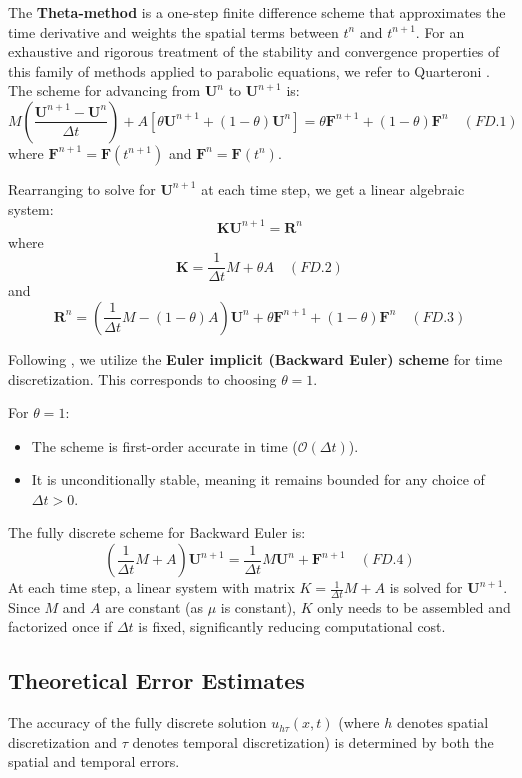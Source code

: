 \documentclass[
  11pt,
]{article}
\begin{document}
The \textbf{Theta-method} is a one-step finite difference scheme that
approximates the time derivative and weights the spatial terms between
$t^n$ and $t^{n+1}$. For an exhaustive and rigorous treatment of the stability and convergence properties of this family of methods applied to parabolic equations, we refer to Quarteroni \cite{quarteroni_numerical_models}. The scheme for advancing from $\mathbf{U}^n$ to
$\mathbf{U}^{n+1}$ is: \[
M \left( \frac{\mathbf{U}^{n+1} - \mathbf{U}^n}{\Delta t} \right) + A \left[ \theta \mathbf{U}^{n+1} + (1-\theta) \mathbf{U}^n \right] = \theta \mathbf{F}^{n+1} + (1-\theta) \mathbf{F}^n \quad (FD.1)
\] where $\mathbf{F}^{n+1} = \mathbf{F}(t^{n+1})$ and
$\mathbf{F}^n = \mathbf{F}(t^n)$.

Rearranging to solve for $\mathbf{U}^{n+1}$ at each time step, we get
a linear algebraic system: \[
\mathbf{K} \mathbf{U}^{n+1} = \mathbf{R}^n
\] where \[
\mathbf{K} = \frac{1}{\Delta t} M + \theta A \quad (FD.2)
\] and \[
\mathbf{R}^n = \left( \frac{1}{\Delta t} M - (1-\theta)A \right) \mathbf{U}^n + \theta \mathbf{F}^{n+1} + (1-\theta)\mathbf{F}^n \quad (FD.3)
\]

Following \cite{picasso1998}, we utilize the \textbf{Euler implicit (Backward Euler) scheme} for time
discretization. This corresponds to choosing $\theta = 1$.

For $\theta=1$:
\begin{itemize}
\item The scheme is first-order accurate in time ($\mathcal{O}(\Delta t)$).
\item It is unconditionally stable, meaning it remains bounded for any choice of $\Delta t > 0$.
\end{itemize}

The fully discrete scheme for Backward Euler is: \[
\left( \frac{1}{\Delta t} M + A \right) \mathbf{U}^{n+1} = \frac{1}{\Delta t} M \mathbf{U}^n + \mathbf{F}^{n+1} \quad (FD.4)
\] At each time step, a linear system with matrix
$K = \frac{1}{\Delta t} M + A$ is solved for $\mathbf{U}^{n+1}$.
Since $M$ and $A$ are constant (as $\mu$ is constant), $K$ only
needs to be assembled and factorized once if $\Delta t$ is fixed,
significantly reducing computational cost.

\subsection{Theoretical Error Estimates}

The accuracy of the fully discrete solution $u_{h\tau}(x,t)$ (where
$h$ denotes spatial discretization and $\tau$ denotes temporal
discretization) is determined by both the spatial and temporal errors.
\end{document}
